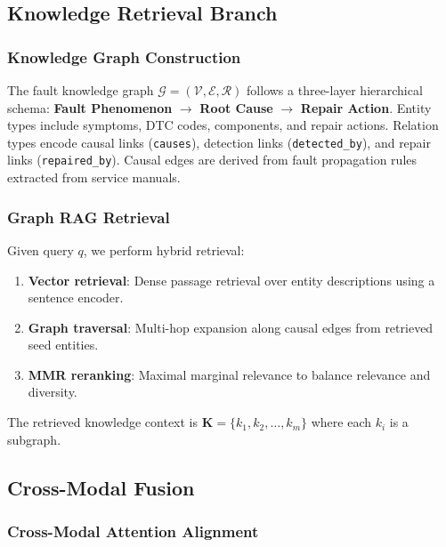 \documentclass[11pt,a4paper]{article}
\begin{document}
\subsection{Knowledge Retrieval Branch}\label{sec:method:knowledge}

\subsubsection{Knowledge Graph Construction}\label{sec:method:kg}

The fault knowledge graph $\mathcal{G} = (\mathcal{V}, \mathcal{E}, \mathcal{R})$ follows a three-layer hierarchical schema: \textbf{Fault Phenomenon} $\rightarrow$ \textbf{Root Cause} $\rightarrow$ \textbf{Repair Action}. Entity types include symptoms, DTC codes, components, and repair actions. Relation types encode causal links (\texttt{causes}), detection links (\texttt{detected\_by}), and repair links (\texttt{repaired\_by}). Causal edges are derived from fault propagation rules extracted from service manuals.

\subsubsection{Graph RAG Retrieval}\label{sec:method:rag}

Given query $q$, we perform hybrid retrieval:
\begin{enumerate}[leftmargin=1.5em]
    \item \textbf{Vector retrieval}: Dense passage retrieval over entity descriptions using a sentence encoder.
    \item \textbf{Graph traversal}: Multi-hop expansion along causal edges from retrieved seed entities.
    \item \textbf{MMR reranking}: Maximal marginal relevance to balance relevance and diversity.
\end{enumerate}
The retrieved knowledge context is $\mathbf{K} = \{k_1, k_2, \ldots, k_m\}$ where each $k_i$ is a subgraph.

\subsection{Cross-Modal Fusion}\label{sec:method:fusion}

\subsubsection{Cross-Modal Attention Alignment}\label{sec:method:crossattn}
\end{document}
